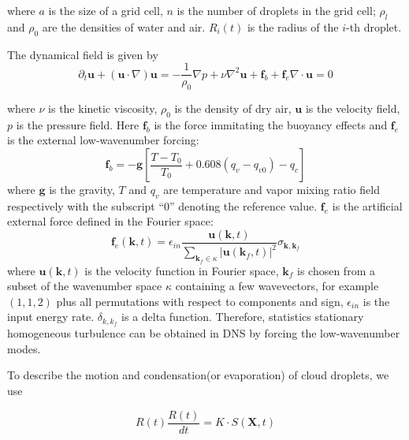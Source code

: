 where $a$ is the size of a grid cell, $n$ is the number of droplets
in the grid cell; $\rho_{l}$ and $\rho_{0}$ are the densities of water
and air. $R_{i}(t)$ is the radius of the $i$-th droplet.

The dynamical field is given by
\begin{subequations}

\begin{equation}
\partial_{t}\mathbf{u}+(\mathbf{u}\cdot\nabla)\mathbf{u}=-\frac{1}{\rho_{0}}\nabla p+\nu\nabla^2 \mathbf{u}+\mathbf{f}_b + \mathbf{f}_e\label{eq:NS1}
\end{equation}


\begin{equation}
\nabla\cdot \mathbf{u}=0\label{eq:NS2}
\end{equation}

\end{subequations}

where $\nu$ is the kinetic viscosity, $\rho_{0}$ is the density of
dry air, $\mathbf{u}$ is the velocity field, $p$ is the pressure field. Here $\mathbf{f}_b$ is the force immitating the buoyancy effects and $\mathbf{f}_e$ is the external low-wavenumber forcing:
\begin{equation}
\mathbf{f}_b= 
-\mathbf{g}[\frac{T-T_{0}}{T_0}+0.608(q_{v}-q_{v0})-q_{c}]
\label{eq:source_term}
\end{equation}
where $\mathbf{g}$ is the gravity, $T$ and $q_{v}$ are temperature
and vapor mixing ratio field respectively with the subscript ``$0$''
denoting the reference value. $\mathbf{f}_e$ is the artificial external force defined in the Fourier space:
\begin{equation}
\mathbf{f}_e(\mathbf{k},t) = \epsilon_{in}\frac{\mathbf{u}(\mathbf{k},t)}
{\sum_{\mathbf{k}_f\in \kappa}|\mathbf{u}(\mathbf{k}_f,t)|^2}
\sigma_{\mathbf{k},\mathbf{k}_f}
\end{equation}
where $\mathbf{u}(\mathbf{k},t)$ is the velocity function in Fourier space, $\mathbf{k}_f$ is chosen from a subset of the wavenumber space $\kappa$ containing a few wavevectors, for example $(1,1,2)$ plus all permutations with respect to components and sign, $\epsilon_{in}$ is the input energy rate. $\delta_{k,k_f}$ is a delta function. Therefore, statistics stationary homogeneous turbulence
can be obtained in DNS by forcing the low-wavenumber modes.

To describe the motion and condensation(or evaporation) of cloud droplets, we use

\begin{equation}
R(t)\frac{R(t)}{dt}=K\cdot S(\mathbf{X},t)\label{eq:Radius}
\end{equation}


